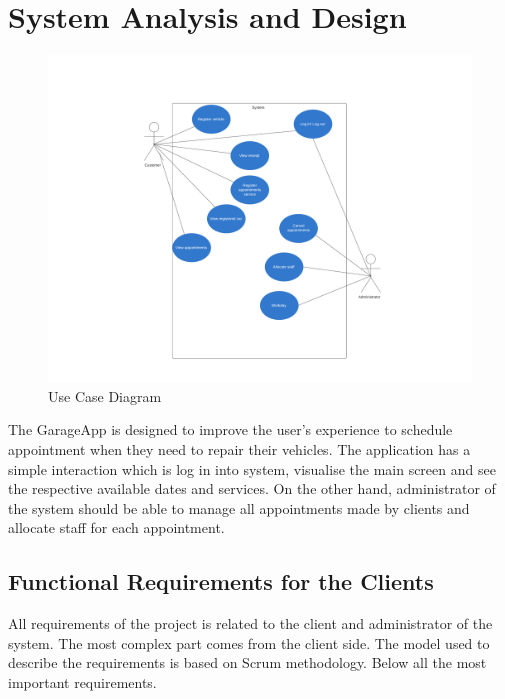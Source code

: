\chapter{System Analysis and Design}


\begin{figure}
  \includegraphics[width=\linewidth]{system_diagram.png}
  \caption{Use Case Diagram}
  \label{fig:diagram}
\end{figure}

The GarageApp is designed  to improve the user's experience to schedule appointment when they need to repair their vehicles. The application has a simple interaction which is log in into system, visualise the main screen and see the respective available dates and services. On the other hand, administrator of the system should be able to manage all appointments made by clients and allocate staff for each appointment.

\section{Functional Requirements for the Clients}

All requirements of the project is related to the client and administrator of the system. The most complex part comes from the client side. The model used to describe the requirements is based on Scrum methodology. Below all the most important requirements.

